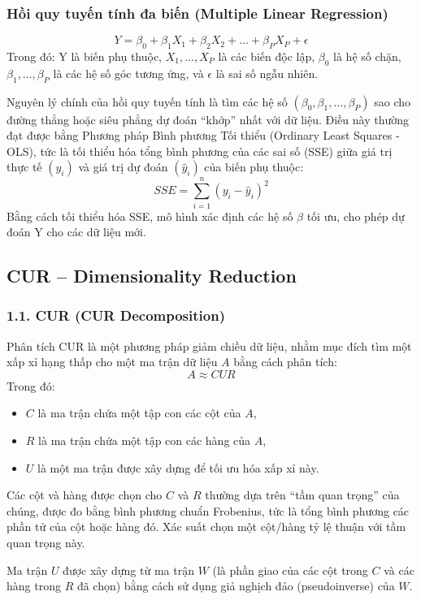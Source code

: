 \documentclass[conference]{IEEEtran}
\begin{document}
\subsubsection{Hồi quy tuyến tính đa biến (Multiple Linear Regression)}
\[
Y = \beta_0 + \beta_1 X_1 + \beta_2 X_2 + \dots + \beta_P X_P + \epsilon
\]
Trong đó: Y là biến phụ thuộc, $X_1, ..., X_P$ là các biến độc lập, $\beta_0$ là hệ số chặn, $\beta_1, ..., \beta_P$ là các hệ số góc tương ứng, và $\epsilon$ là sai số ngẫu nhiên.


Nguyên lý chính của hồi quy tuyến tính là tìm các hệ số $(\beta_0, \beta_1, ..., \beta_P)$ sao cho đường thẳng hoặc siêu phẳng dự đoán “khớp” nhất với dữ liệu. Điều này thường đạt được bằng Phương pháp Bình phương Tối thiểu (Ordinary Least Squares - OLS), tức là tối thiểu hóa tổng bình phương của các sai số (SSE) giữa giá trị thực tế $(y_i)$ và giá trị dự đoán $(\hat{y}_i)$ của biến phụ thuộc:
\[
SSE = \sum_{i=1}^{n} (y_i - \hat{y}_i)^2
\]
Bằng cách tối thiểu hóa SSE, mô hình xác định các hệ số $\beta$ tối ưu, cho phép dự đoán Y cho các dữ liệu mới.

\subsection{CUR – Dimensionality Reduction}
\subsubsection{1.1.	CUR (CUR Decomposition)}
Phân tích CUR là một phương pháp giảm chiều dữ liệu, nhằm mục đích tìm một xấp xỉ hạng thấp cho một ma trận dữ liệu $A$ bằng cách phân tích:
\[
A \approx CUR
\]
Trong đó:

\begin{itemize}
    \item $C$ là ma trận chứa một tập con các cột của $A$,
    \item $R$ là ma trận chứa một tập con các hàng của $A$,
    \item $U$ là một ma trận được xây dựng để tối ưu hóa xấp xỉ này.
\end{itemize}

Các cột và hàng được chọn cho $C$ và $R$ thường dựa trên ``tầm quan trọng'' của chúng, được đo bằng bình phương chuẩn Frobenius, tức là tổng bình phương các phần tử của cột hoặc hàng đó. Xác suất chọn một cột/hàng tỷ lệ thuận với tầm quan trọng này.

Ma trận $U$ được xây dựng từ ma trận $W$ (là phần giao của các cột trong $C$ và các hàng trong $R$ đã chọn) bằng cách sử dụng giả nghịch đảo (pseudoinverse) của $W$.
\end{document}
